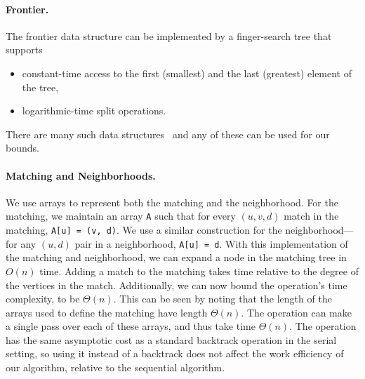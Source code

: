 \paragraph{Frontier.}  
%
The frontier data structure can be implemented by a finger-search tree
that supports
\begin{itemize}
\item  constant-time access to the first (smallest) and the
last (greatest) element of the tree,
\item logarithmic-time split operations.
\end{itemize}
%
There are many such data
structures~\cite{GMPR77,KT96,hinze-paterson-06,chunkedtreesequences} 
and any of these can be used for our bounds.


\paragraph{Matching and Neighborhoods.}
We use arrays to represent both the matching and
the neighborhood.
%
For the matching, we maintain an array \texttt{A} such that
for every $(u, v, d)$ match in the matching, \texttt{A[u] = (v, d)}.
%
We use a similar construction for the neighborhood---for
any $(u, d)$ pair in a neighborhood, \texttt{A[u] = d}.
%
With this implementation of the matching and neighborhood,
we can expand a node in the matching tree in $O(n)$ time.
%
Adding a match to the matching takes time relative
to the degree of the vertices in the match.
%
Additionally, we can now bound the  operation's time complexity,
to be $\Theta(n)$.
  This can be seen by noting that the length of the arrays
  used to define the matching have length $\Theta(n)$.
  The  operation can make a single pass over
  each of these arrays, and thus take time $\Theta(n)$.
%
The  operation has the same asymptotic cost
as a standard backtrack operation in the serial setting,
so using it instead of a backtrack does not affect the
work efficiency of our algorithm, relative to the sequential algorithm.

